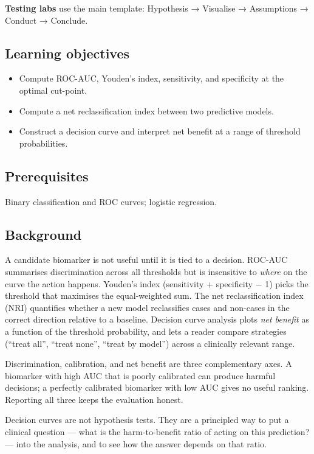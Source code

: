 \documentclass[
]{article}
\author{}
\date{\vspace{-2.5em}}
\providecommand{\tightlist}{%
  \setlength{\itemsep}{0pt}\setlength{\parskip}{0pt}}
\begin{document}
\textbf{Testing labs} use the main template: Hypothesis → Visualise →
Assumptions → Conduct → Conclude.

\subsection{Learning objectives}\label{learning-objectives}

\begin{itemize}
\tightlist
\item
  Compute ROC-AUC, Youden's index, sensitivity, and specificity at the
  optimal cut-point.
\item
  Compute a net reclassification index between two predictive models.
\item
  Construct a decision curve and interpret net benefit at a range of
  threshold probabilities.
\end{itemize}

\subsection{Prerequisites}\label{prerequisites}

Binary classification and ROC curves; logistic regression.

\subsection{Background}\label{background}

A candidate biomarker is not useful until it is tied to a decision.
ROC-AUC summarises discrimination across all thresholds but is
insensitive to \emph{where} on the curve the action happens. Youden's
index (sensitivity + specificity − 1) picks the threshold that maximises
the equal-weighted sum. The net reclassification index (NRI) quantifies
whether a new model reclassifies cases and non-cases in the correct
direction relative to a baseline. Decision curve analysis plots
\emph{net benefit} as a function of the threshold probability, and lets
a reader compare strategies (``treat all'', ``treat none'', ``treat by
model'') across a clinically relevant range.

Discrimination, calibration, and net benefit are three complementary
axes. A biomarker with high AUC that is poorly calibrated can produce
harmful decisions; a perfectly calibrated biomarker with low AUC gives
no useful ranking. Reporting all three keeps the evaluation honest.

Decision curves are not hypothesis tests. They are a principled way to
put a clinical question --- what is the harm-to-benefit ratio of acting
on this prediction? --- into the analysis, and to see how the answer
depends on that ratio.
\end{document}
